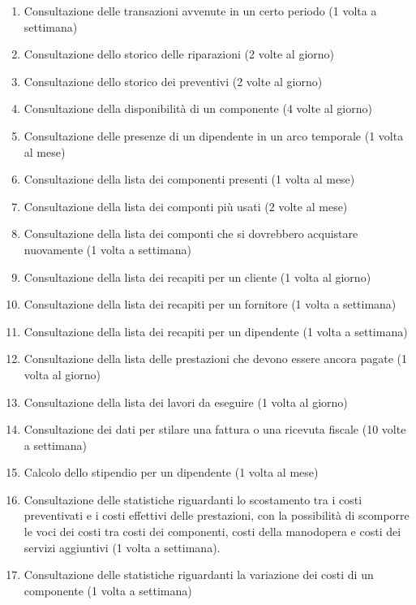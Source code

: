 \begin{enumerate}
			\item Consultazione delle transazioni avvenute in un certo periodo (1 volta a settimana)
			\item Consultazione dello storico delle riparazioni (2 volte al giorno)
			\item Consultazione dello storico dei preventivi (2 volte al giorno)
			\item Consultazione della disponibilità di un componente (4 volte al giorno)
			\item Consultazione delle presenze di un dipendente in un arco temporale (1 volta al mese)
			\item Consultazione della lista dei componenti presenti (1 volta al mese)
			\item Consultazione della lista dei componti più usati (2 volte al mese)
			\item Consultazione della lista dei componti che si dovrebbero acquistare nuovamente (1 volta a settimana)
			\item Consultazione della lista dei recapiti per un cliente (1 volta al giorno)
			\item Consultazione della lista dei recapiti per un fornitore (1 volta a settimana)
			\item Consultazione della lista dei recapiti per un dipendente (1 volta a settimana)
			\item Consultazione della lista delle prestazioni che devono essere ancora pagate (1 volta al giorno)
			\item Consultazione della lista dei lavori da eseguire (1 volta al giorno)
			\item Consultazione dei dati per stilare una fattura o una ricevuta fiscale (10 volte a settimana)
			\item Calcolo dello stipendio per un dipendente (1 volta al mese)
			\item Consultazione delle statistiche riguardanti lo scostamento tra i costi preventivati e i costi effettivi delle prestazioni, con la possibilità di scomporre le voci dei costi tra costi dei componenti, costi della manodopera e costi dei servizi aggiuntivi (1 volta a settimana).
			\item Consultazione delle statistiche riguardanti la variazione dei costi di un componente (1 volta a settimana)
			
		\end{enumerate}